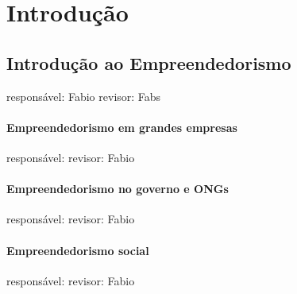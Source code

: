 \section{Introdução}

\subsection{Introdução ao Empreendedorismo}
responsável: Fabio revisor: Fabs

\paragraph{Empreendedorismo em grandes empresas}
responsável: revisor: Fabio

\paragraph{Empreendedorismo no governo e ONGs}
responsável: revisor: Fabio

\paragraph{Empreendedorismo social}
responsável: revisor: Fabio
